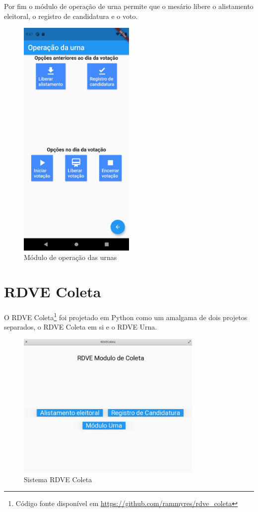 Por fim o módulo de operação de urna permite que o mesário libere o alistamento eleitoral, o registro de candidatura e o voto. 

\begin{figure}[!htb]
	\centering
	\includegraphics[width=0.5\textwidth]{imagens/wallet3}
	\caption{Módulo de operação das urnas}
	\label{fig:wallet_operador}
\end{figure}
\clearpage

\section{RDVE Coleta}

O RDVE Coleta\footnote{Código fonte disponível em \url{https://github.com/rammyres/rdve_coleta}} foi projetado em Python como um amalgama de dois projetos separados, o RDVE Coleta em si e o RDVE Urna.

\begin{figure}[h!]
	\centering
	\includegraphics[width=0.8\textwidth]{imagens/coleta1}
	\caption{Sistema RDVE Coleta}
	\label{fig:coleta1}
\end{figure}

